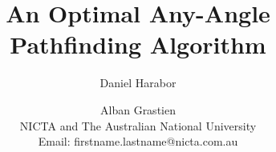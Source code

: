 \documentclass[letterpaper]{article}
\begin{document}
\title{An Optimal Any-Angle Pathfinding Algorithm}
\author{
Daniel Harabor 
\and 
Alban Grastien \\
NICTA and The Australian National University \\
Email: firstname.lastname@nicta.com.au
}

\maketitle












\end{document}
